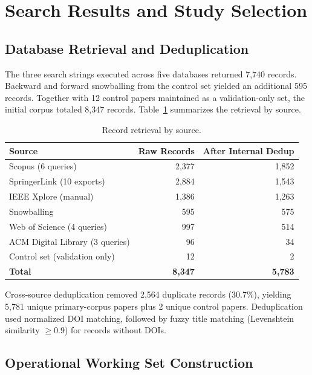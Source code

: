 \section{Search Results and Study Selection}
\label{sec:slr-results-selection}

\subsection{Database Retrieval and Deduplication}

The three search strings executed across five databases returned 7{,}740
records. Backward and forward snowballing from the control set yielded an
additional 595 records. Together with 12 control papers maintained as a
validation-only set, the initial corpus totaled 8{,}347 records.
Table~\ref{tab:retrieval} summarizes the retrieval by source.

\begin{table}[htbp]
\centering
\caption{Record retrieval by source.}
\label{tab:retrieval}
\begin{tabular}{lrr}
\toprule
\textbf{Source} & \textbf{Raw Records} & \textbf{After Internal Dedup} \\
\midrule
Scopus (6 queries)      & 2{,}377 & 1{,}852 \\
SpringerLink (10 exports) & 2{,}884 & 1{,}543 \\
IEEE Xplore (manual)    & 1{,}386 & 1{,}263 \\
Snowballing             &   595   &   575   \\
Web of Science (4 queries) & 997  &   514   \\
ACM Digital Library (3 queries) & 96 &  34  \\
Control set (validation only) & 12 &    2   \\
\midrule
\textbf{Total} & \textbf{8{,}347} & \textbf{5{,}783} \\
\bottomrule
\end{tabular}
\end{table}

Cross-source deduplication removed 2{,}564 duplicate records (30.7\%),
yielding 5{,}781 unique primary-corpus papers plus 2 unique control papers.
Deduplication used normalized DOI matching, followed by fuzzy title matching
(Levenshtein similarity $\geq 0.9$) for records without DOIs.

\subsection{Operational Working Set Construction}

